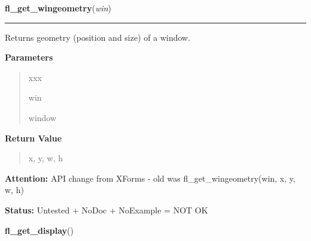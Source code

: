 \hspace{.8\funcindent}\begin{boxedminipage}{\funcwidth}

    \raggedright \textbf{fl\_get\_wingeometry}(\textit{win})

    \vspace{-1.5ex}

    \rule{\textwidth}{0.5\fboxrule}
\setlength{\parskip}{2ex}
    Returns geometry (position and size) of a window.

\setlength{\parskip}{1ex}
      \textbf{Parameters}
      \vspace{-1ex}

      \begin{quote}
        \begin{Ventry}{xxx}

          \item[win]

          window

        \end{Ventry}

      \end{quote}

      \textbf{Return Value}
    \vspace{-1ex}

      \begin{quote}
      x, y, w, h

      \end{quote}

\textbf{Attention:} API change from XForms - old was fl\_get\_wingeometry(win, x, y, w, h)



\textbf{Status:} Untested + NoDoc + NoExample = NOT OK



    \end{boxedminipage}

    \label{xformslib:library:fl_get_display}

    \vspace{0.5ex}

\hspace{.8\funcindent}\begin{boxedminipage}{\funcwidth}

    \raggedright \textbf{fl\_get\_display}()

\setlength{\parskip}{2ex}
\setlength{\parskip}{1ex}
    \end{boxedminipage}

